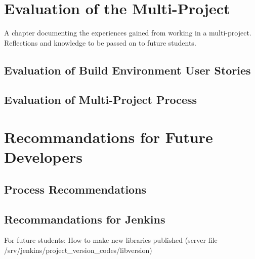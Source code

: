 \chapter{Evaluation of the Multi-Project}%
A chapter documenting the experiences gained from working in a multi-project. Reflections
and knowledge to be passed on to future students.

\section{Evaluation of Build Environment User Stories}
\section{Evaluation of Multi-Project Process}
\chapter{Recommandations for Future Developers}
\section{Process Recommendations}
\section{Recommandations for Jenkins}
For future students: How to make new libraries published (server file /srv/jenkins/project\_version\_codes/libversion)
